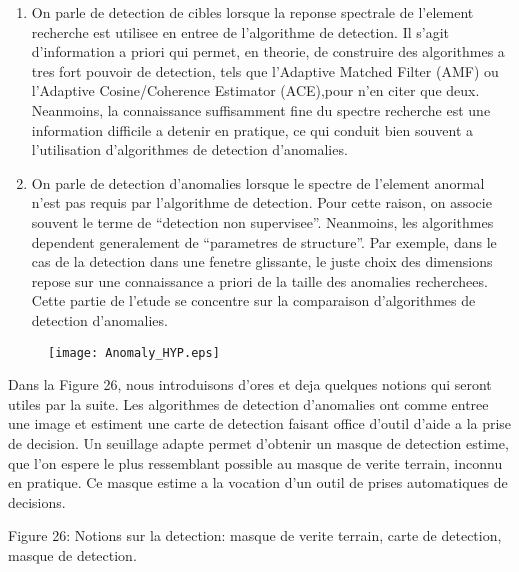\begin{enumerate}
\item {On parle de detection de cibles lorsque la reponse
spectrale de l'element recherche est utilisee en entree de
l'algorithme de detection. Il s'agit d'information a priori qui
permet, en theorie, de construire des algorithmes a tres fort pouvoir
de detection, tels que l'Adaptive Matched Filter (AMF) ou l'Adaptive
Cosine/Coherence Estimator (ACE),pour n'en citer que deux. Neanmoins,
la connaissance suffisamment fine du spectre recherche est une
information difficile a detenir en pratique, ce qui conduit bien
souvent a l'utilisation d'algorithmes de detection d'anomalies.}
\item {On parle de detection d'anomalies lorsque le spectre de
  l'element anormal n'est pas requis par l'algorithme de
  detection. Pour cette raison, on associe souvent le terme de
  ``detection non supervisee''. Neanmoins, les algorithmes dependent
  generalement de ``parametres de structure''. Par exemple, dans le
  cas de la detection dans une fenetre glissante, le juste choix des
  dimensions repose sur une connaissance a priori de la taille des
  anomalies recherchees. Cette partie de l'etude se concentre sur la
  comparaison d'algorithmes de detection d'anomalies.}
\end{enumerate}
    
\begin{figure}[h]
  \centering
  \texttt{[image: Anomaly\_HYP.eps]}
  \label{fig:decomp_mml}
\end{figure}
Dans la Figure 26, nous introduisons d'ores et deja quelques notions
qui seront utiles par la suite. Les algorithmes de detection
d'anomalies ont comme entree une image et estiment une carte de
detection faisant office d'outil d'aide a la prise de decision. Un
seuillage adapte permet d'obtenir un masque de detection estime, que
l'on espere le plus ressemblant possible au masque de verite terrain,
inconnu en pratique. Ce masque estime a la vocation d'un outil de
prises automatiques de decisions.

Figure 26: Notions sur la detection: masque de verite terrain, carte
de detection, masque de detection.

